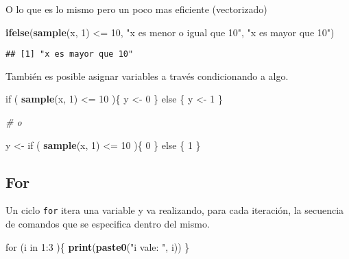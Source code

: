 \documentclass[]{article}
\newenvironment{Shaded}{\begin{snugshade}}{\end{snugshade}}
\newcommand{\KeywordTok}[1]{\textcolor[rgb]{0.13,0.29,0.53}{\textbf{{#1}}}}
\newcommand{\DecValTok}[1]{\textcolor[rgb]{0.00,0.00,0.81}{{#1}}}
\newcommand{\StringTok}[1]{\textcolor[rgb]{0.31,0.60,0.02}{{#1}}}
\newcommand{\CommentTok}[1]{\textcolor[rgb]{0.56,0.35,0.01}{\textit{{#1}}}}
\newcommand{\NormalTok}[1]{{#1}}
\begin{document}
O lo que es lo mismo pero un poco mas eficiente (vectorizado)

\begin{Shaded}
\begin{Highlighting}[]
\KeywordTok{ifelse}\NormalTok{(}\KeywordTok{sample}\NormalTok{(x, }\DecValTok{1}\NormalTok{) <=}\StringTok{ }\DecValTok{10}\NormalTok{, }\StringTok{"x es menor o igual que 10"}\NormalTok{, }\StringTok{"x es mayor que 10"}\NormalTok{)}
\end{Highlighting}
\end{Shaded}

\begin{verbatim}
## [1] "x es mayor que 10"
\end{verbatim}

También es posible asignar variables a través condicionando a algo.

\begin{Shaded}
\begin{Highlighting}[]
\NormalTok{if ( }\KeywordTok{sample}\NormalTok{(x, }\DecValTok{1}\NormalTok{) <=}\StringTok{ }\DecValTok{10} \NormalTok{)\{}
  \NormalTok{y <-}\StringTok{ }\DecValTok{0}
\NormalTok{\} else \{}
  \NormalTok{y <-}\StringTok{ }\DecValTok{1}
\NormalTok{\}}

\CommentTok{# o}

\NormalTok{y <-}\StringTok{ }\NormalTok{if ( }\KeywordTok{sample}\NormalTok{(x, }\DecValTok{1}\NormalTok{) <=}\StringTok{ }\DecValTok{10} \NormalTok{)\{}
    \DecValTok{0}
  \NormalTok{\} else \{}
    \DecValTok{1}
  \NormalTok{\}}
\end{Highlighting}
\end{Shaded}

\subsection{For}\label{for}

Un ciclo \texttt{for} itera una variable y va realizando, para cada
iteración, la secuencia de comandos que se especifica dentro del mismo.

\begin{Shaded}
\begin{Highlighting}[]
\NormalTok{for (i in }\DecValTok{1}\NormalTok{:}\DecValTok{3} \NormalTok{)\{}
  \KeywordTok{print}\NormalTok{(}\KeywordTok{paste0}\NormalTok{(}\StringTok{"i vale: "}\NormalTok{, i))}
\NormalTok{\}}
\end{Highlighting}
\end{Shaded}
\end{document}
